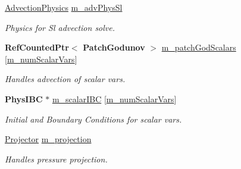 \begin{DoxyCompactItemize}
\mbox{\label{class_a_m_r_level_mushy_layer_a6f0d3470a6089238d42a6eb3a2222142}} 
\hyperlink{class_advection_physics}{Advection\+Physics} \hyperlink{class_a_m_r_level_mushy_layer_a6f0d3470a6089238d42a6eb3a2222142}{m\+\_\+adv\+Phys\+Sl}
\begin{DoxyCompactList}\small\item\em Physics for Sl advection solve. \end{DoxyCompactList}\item 
\mbox{\label{class_a_m_r_level_mushy_layer_a624292a7c8fa00de496a75a9816d8f29}} 
\textbf{ Ref\+Counted\+Ptr}$<$ \textbf{ Patch\+Godunov} $>$ \hyperlink{class_a_m_r_level_mushy_layer_a624292a7c8fa00de496a75a9816d8f29}{m\+\_\+patch\+God\+Scalars} \mbox{[}\hyperlink{mushy_layer_opt_8h_afcada9fb65a998951da882b5c10191fea83db32f5839575c9d7812f3cd0727d07}{m\+\_\+num\+Scalar\+Vars}\mbox{]}
\begin{DoxyCompactList}\small\item\em Handles advection of scalar vars. \end{DoxyCompactList}\item 
\mbox{\label{class_a_m_r_level_mushy_layer_aff6179584bf6eaa3c6c016f03e23ba48}} 
\textbf{ Phys\+I\+BC} $\ast$ \hyperlink{class_a_m_r_level_mushy_layer_aff6179584bf6eaa3c6c016f03e23ba48}{m\+\_\+scalar\+I\+BC} \mbox{[}\hyperlink{mushy_layer_opt_8h_afcada9fb65a998951da882b5c10191fea83db32f5839575c9d7812f3cd0727d07}{m\+\_\+num\+Scalar\+Vars}\mbox{]}
\begin{DoxyCompactList}\small\item\em Initial and Boundary Conditions for scalar vars. \end{DoxyCompactList}\item 
\mbox{\label{class_a_m_r_level_mushy_layer_a2eb89664c4fab25c758e1eb80ad7edbb}} 
\hyperlink{class_projector}{Projector} \hyperlink{class_a_m_r_level_mushy_layer_a2eb89664c4fab25c758e1eb80ad7edbb}{m\+\_\+projection}
\begin{DoxyCompactList}\small\item\em Handles pressure projection. \end{DoxyCompactList}\item 
\mbox{\label{class_a_m_r_level_mushy_layer_a7823bcf21f31a94608f186498d96714c}} 

\end{DoxyCompactItemize}
